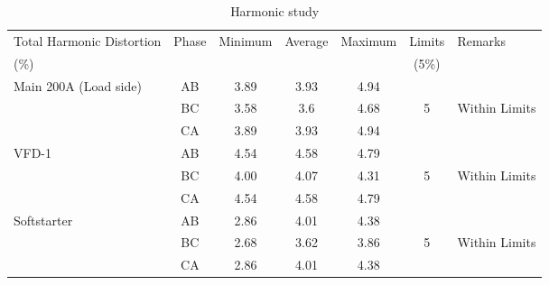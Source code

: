 \begin{table}[!htb]
	\caption{Harmonic study}
	\label{tbl_ch04_elecaudit_harmonicstudy}
	{\scriptsize
	
\begin{tabular}{l|l|l|l|l|l|l}
\hline
Total Harmonic Distortion & \multicolumn{1}{c|}{Phase} & \multicolumn{1}{c|}{Minimum} & \multicolumn{1}{c|}{Average} & \multicolumn{1}{c|}{Maximum} & \multicolumn{1}{c|}{Limits} & Remarks \\ 
(\%) & \multicolumn{1}{c|}{} & \multicolumn{1}{c|}{} & \multicolumn{1}{c|}{} & \multicolumn{1}{c|}{} & \multicolumn{1}{c|}{(5\%)} &  \\ 
\hline
Main 200A (Load side) & \multicolumn{1}{c|}{AB} & \multicolumn{1}{c|}{3.89} & \multicolumn{1}{c|}{3.93} & \multicolumn{1}{c|}{4.94} & \multicolumn{1}{c|}{} &  \\ 
& \multicolumn{1}{c|}{BC} & \multicolumn{1}{c|}{3.58} & \multicolumn{1}{c|}{3.6} & \multicolumn{1}{c|}{4.68} & \multicolumn{1}{c|}{5} & Within  Limits \\ 
& \multicolumn{1}{c|}{CA} & \multicolumn{1}{c|}{3.89} & \multicolumn{1}{c|}{3.93} & \multicolumn{1}{c|}{4.94} & \multicolumn{1}{c|}{} &  \\ 
\hline
VFD-1 & \multicolumn{1}{c|}{AB} & \multicolumn{1}{c|}{4.54} & \multicolumn{1}{c|}{4.58} & \multicolumn{1}{c|}{4.79} & \multicolumn{1}{c|}{} &  \\ 
& \multicolumn{1}{c|}{BC} & \multicolumn{1}{c|}{4.00} & \multicolumn{1}{c|}{4.07} & \multicolumn{1}{c|}{4.31} & \multicolumn{1}{c|}{5} & Within  Limits \\ 
& \multicolumn{1}{c|}{CA} & \multicolumn{1}{c|}{4.54} & \multicolumn{1}{c|}{4.58} & \multicolumn{1}{c|}{4.79} & \multicolumn{1}{c|}{} &  \\ 
\hline
Softstarter & \multicolumn{1}{c|}{AB} & \multicolumn{1}{c|}{2.86} & \multicolumn{1}{c|}{4.01} & \multicolumn{1}{c|}{4.38} & \multicolumn{1}{c|}{} &  \\ 
& \multicolumn{1}{c|}{BC} & \multicolumn{1}{c|}{2.68} & \multicolumn{1}{c|}{3.62} & \multicolumn{1}{c|}{3.86} & \multicolumn{1}{c|}{5} & Within Limits \\ 
& \multicolumn{1}{c|}{CA} & \multicolumn{1}{c|}{2.86} & \multicolumn{1}{c|}{4.01} & \multicolumn{1}{c|}{4.38} & \multicolumn{1}{c|}{} &  \\ 
\hline
\end{tabular}

		
	}%
\end{table}